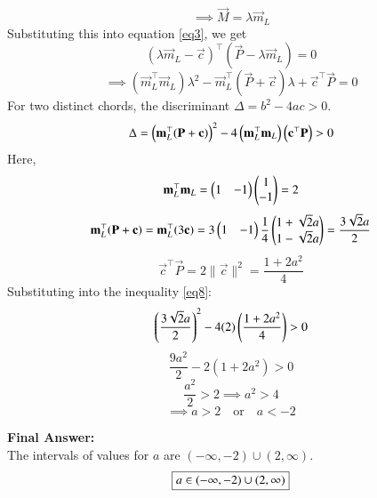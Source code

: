 \documentclass[journal,12pt,onecolumn]{IEEEtran}
\theoremstyle{remark}
\begin{document}
\begin{equation}
\implies \vec{M} = \lambda\vec{m}_L
\end{equation}
Substituting this into equation \eqref{eq3}, we get
\begin{equation}
    (\lambda\vec{m}_L-\vec{c})^{\top}(\vec{P}-\lambda\vec{m}_L) = 0
\end{equation}
\begin{equation}
    \implies (\vec{m}_L^{\top}\vec{m}_L)\lambda^2 - \vec{m}_L^{\top}(\vec{P}+\vec{c})\lambda + \vec{c}^{\top}\vec{P} = 0
\end{equation}
For two distinct chords, the discriminant $\Delta = b^2 - 4ac > 0$.
\begin{equation}
    \Delta = \left(\mathbf{m}_L^{\top}(\mathbf{P}+\mathbf{c})\right)^2 - 4\left(\mathbf{m}_L^{\top}\mathbf{m}_L\right)\left(\mathbf{c}^{\top}\mathbf{P}\right) > 0 \label{eq8}
\end{equation}
Here,
\begin{equation}
    \mathbf{m}_L^{\top}\mathbf{m}_L = \begin{pmatrix}1&-1\end{pmatrix}\begin{pmatrix}1\\-1\end{pmatrix} = 2
\end{equation}
\begin{equation}
    \mathbf{m}_L^{\top}(\mathbf{P}+\mathbf{c}) = \mathbf{m}_L^{\top}(3\mathbf{c}) = 3\begin{pmatrix}1&-1\end{pmatrix}\frac{1}{4}\begin{pmatrix}1+\sqrt{2}a\\1-\sqrt{2}a\end{pmatrix} = \frac{3\sqrt{2}a}{2}
\end{equation}
\begin{equation}
    \vec{c}^{\top}\vec{P} = 2\|\vec{c}\|^2 = \frac{1+2a^2}{4}
\end{equation}
Substituting into the inequality \eqref{eq8}:
\begin{equation}
    \left(\frac{3\sqrt{2}a}{2}\right)^2 - 4(2)\left(\frac{1+2a^2}{4}\right) > 0
\end{equation}
\begin{equation}
    \frac{9a^2}{2} - 2(1+2a^2) > 0
\end{equation}
\begin{equation}
    \frac{a^2}{2} > 2 \implies a^2 > 4
\end{equation}
\begin{equation}
    \implies a > 2 \quad \text{or} \quad a < -2
\end{equation}

\vspace{0.5cm}

\textbf{Final Answer: }\\
The intervals of values for $a$ are $(-\infty, -2) \cup (2, \infty)$.
\begin{equation}
    \fbox{$a \in (-\infty, -2) \cup (2, \infty)$}
\end{equation}
\end{document}
